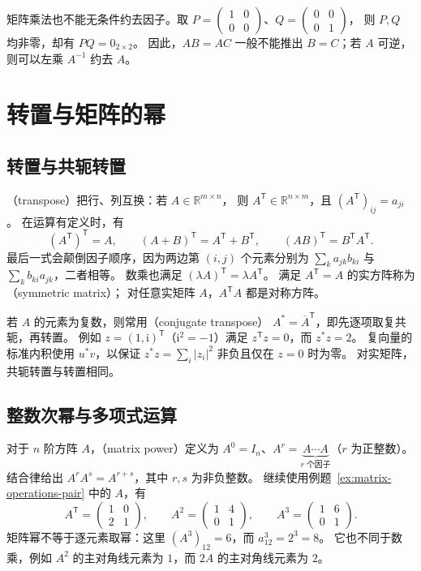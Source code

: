 \documentclass[UTF8,12pt,a4paper,fontset=fandol]{ctexart}
\begin{document}
矩阵乘法也不能无条件约去因子。取
$P=\begin{pmatrix}1&0\\0&0\end{pmatrix}$、$Q=\begin{pmatrix}0&0\\0&1\end{pmatrix}$，
则 $P,Q$ 均非零，却有 $PQ=0_{2\times2}$。
因此，$AB=AC$ 一般不能推出 $B=C$；若 $A$ 可逆，则可以左乘 $A^{-1}$ 约去 $A$。

\section{转置与矩阵的幂}

\subsection{转置与共轭转置}

（transpose）把行、列互换：若 $A\in\mathbb R^{m\times n}$，
则 $A^{\mathsf T}\in\mathbb R^{n\times m}$，且 $(A^{\mathsf T})_{ij}=a_{ji}$。
在运算有定义时，有
\[
  (A^{\mathsf T})^{\mathsf T}=A,\qquad
  (A+B)^{\mathsf T}=A^{\mathsf T}+B^{\mathsf T},\qquad
  (AB)^{\mathsf T}=B^{\mathsf T}A^{\mathsf T}.
\]
最后一式会颠倒因子顺序，因为两边第 $(i,j)$ 个元素分别为
$\sum_k a_{jk}b_{ki}$ 与 $\sum_k b_{ki}a_{jk}$，二者相等。
数乘也满足 $(\lambda A)^{\mathsf T}=\lambda A^{\mathsf T}$。
满足 $A^{\mathsf T}=A$ 的实方阵称为（symmetric matrix）；
对任意实矩阵 $A$，$A^{\mathsf T}A$ 都是对称方阵。

若 $A$ 的元素为复数，则常用（conjugate transpose）
$A^*=\overline{A}^{\mathsf T}$，即先逐项取复共轭，再转置。
例如 $z=(1,\mathrm i)^{\mathsf T}$（$\mathrm i^2=-1$）满足
$z^{\mathsf T}z=0$，而 $z^*z=2$。
复向量的标准内积使用 $u^*v$，以保证 $z^*z=\sum_i|z_i|^2$ 非负且仅在 $z=0$ 时为零。
对实矩阵，共轭转置与转置相同。

\subsection{整数次幂与多项式运算}

对于 $n$ 阶方阵 $A$，（matrix power）定义为
$A^0=I_n$、$A^r=\underbrace{A\cdots A}_{r\text{ 个因子}}$（$r$ 为正整数）。
结合律给出 $A^rA^s=A^{r+s}$，其中 $r,s$ 为非负整数。
继续使用例题~\ref{ex:matrix-operations-pair} 中的 $A$，有
\[
  A^{\mathsf T}=\begin{pmatrix}1&0\\2&1\end{pmatrix},\qquad
  A^2=\begin{pmatrix}1&4\\0&1\end{pmatrix},\qquad
  A^3=\begin{pmatrix}1&6\\0&1\end{pmatrix}.
\]
矩阵幂不等于逐元素取幂：这里 $(A^3)_{12}=6$，而 $a_{12}^3=2^3=8$。
它也不同于数乘，例如 $A^2$ 的主对角线元素为 $1$，而 $2A$ 的主对角线元素为 $2$。
\end{document}
